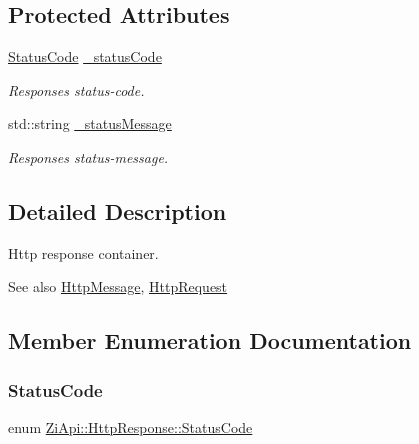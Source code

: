 \subsection*{Protected Attributes}
\begin{DoxyCompactItemize}
\item 
\mbox{\label{structZiApi_1_1HttpResponse_a0e4b24ee46576f8603a1d148ee5243c0}} 
\mbox{\hyperlink{structZiApi_1_1HttpResponse_aa304ae6c6c8d12f651eafc75fb203d90}{Status\+Code}} \mbox{\hyperlink{structZiApi_1_1HttpResponse_a0e4b24ee46576f8603a1d148ee5243c0}{\+\_\+status\+Code}}
\begin{DoxyCompactList}\small\item\em Response\textquotesingle{}s status-\/code. \end{DoxyCompactList}\item 
\mbox{\label{structZiApi_1_1HttpResponse_ada43f4f8e721527cca4082bf0a6a3f40}} 
std\+::string \mbox{\hyperlink{structZiApi_1_1HttpResponse_ada43f4f8e721527cca4082bf0a6a3f40}{\+\_\+status\+Message}}
\begin{DoxyCompactList}\small\item\em Response\textquotesingle{}s status-\/message. \end{DoxyCompactList}\end{DoxyCompactItemize}


\subsection{Detailed Description}
Http response container. 

\begin{DoxySeeAlso}{See also}
\mbox{\hyperlink{classZiApi_1_1HttpMessage}{Http\+Message}}, \mbox{\hyperlink{structZiApi_1_1HttpRequest}{Http\+Request}} 
\end{DoxySeeAlso}


\subsection{Member Enumeration Documentation}
\mbox{\label{structZiApi_1_1HttpResponse_aa304ae6c6c8d12f651eafc75fb203d90}} 
\subsubsection{\texorpdfstring{StatusCode}{StatusCode}}
{\footnotesize\ttfamily enum \mbox{\hyperlink{structZiApi_1_1HttpResponse_aa304ae6c6c8d12f651eafc75fb203d90}{Zi\+Api\+::\+Http\+Response\+::\+Status\+Code}}\hspace{0.3cm}{\ttfamily [strong]}}

